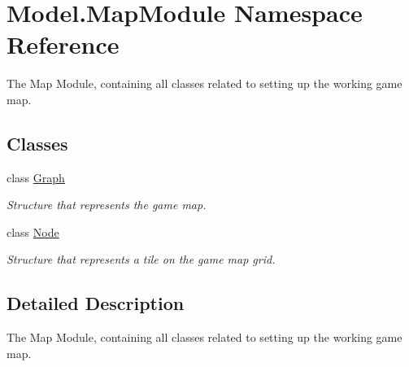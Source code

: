 \hypertarget{namespace_model_1_1_map_module}{}\section{Model.\+Map\+Module Namespace Reference}
\label{namespace_model_1_1_map_module}


The Map Module, containing all classes related to setting up the working game map.  


\subsection*{Classes}
\begin{DoxyCompactItemize}
\item 
class \hyperlink{class_model_1_1_map_module_1_1_graph}{Graph}
\begin{DoxyCompactList}\small\item\em Structure that represents the game map. \end{DoxyCompactList}\item 
class \hyperlink{class_model_1_1_map_module_1_1_node}{Node}
\begin{DoxyCompactList}\small\item\em Structure that represents a tile on the game map grid. \end{DoxyCompactList}\end{DoxyCompactItemize}


\subsection{Detailed Description}
The Map Module, containing all classes related to setting up the working game map. 

